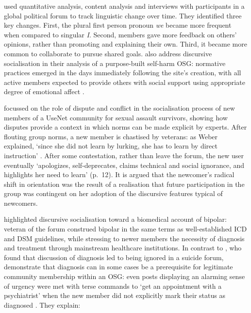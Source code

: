 \textcite{cassell_language_2005} used quantitative analysis, content analysis and interviews with participants in a global political \gls{forum} to track linguistic change over time. They identified three key changes. First, the plural first person pronoun \emph{we} became more frequent when compared to singular \emph{I}. Second, \glspl{member} gave more feedback on others' opinions, rather than promoting and explaining their own. Third, it became more common to collaborate to pursue shared goals. \textcite{smithson_membership_2011} also address discursive socialisation in their analysis of a purpose\hyp{}built self\hyp{}harm \gls{OSG}: normative practices emerged in the days immediately following the site's creation, with all active \glspl{member} expected to provide others with social support using appropriate degree of emotional affect \cite{smithson_problem_2011}. 

\textcite[c.f. Section \ref{sect:post-structure}]{weber_missed_2011} focussed on the role of dispute and conflict in the socialisation process of new \glspl{member} of a UseNet community for sexual assault survivors, showing how disputes provide a context in which norms can be made explicit by experts. After flouting group norms, a new member is chastised by veterans: as Weber explained, `since she did not learn by lurking, she has to learn by direct instruction' \parencite*[p.~1]{weber_missed_2011}. After some contestation, rather than leave the \gls{forum}, the new user eventually `apologizes, self-deprecates, claims technical and social ignorance, and highlights her need to learn' (p.~12). It is argued that the newcomer's radical shift in orientation was the result of a realisation that future participation in the group was contingent on her adoption of the discursive features typical of newcomers.

\textcite[c.f. Section \ref{sect:advice}]{vayreda_social_2009} highlighted discursive socialisation toward a biomedical account of \gls{bipolar}: veteran  of the \gls{forum} construed \gls{bipolar} in the same terms as well\hyp{}established \gls{ICD} and \gls{DSM} guidelines, while stressing to newer members the necessity of diagnosis and treatment through mainstream healthcare institutions. In contrast to \textcite{horne_doing_2009}, who found that discussion of diagnosis led to being ignored in a suicide \gls{forum}, \citeauthor{vayreda_social_2009} demonstrate that diagnosis can in some cases be a prerequisite for legitimate community membership within an \gls{OSG}: even \glspl{post} displaying an alarming sense of urgency were met with terse commands to `get an appointment with a psychiatrist' when the new member did not explicitly mark their status as diagnosed \parencite*[p.~940]{vayreda_social_2009}. They explain:

